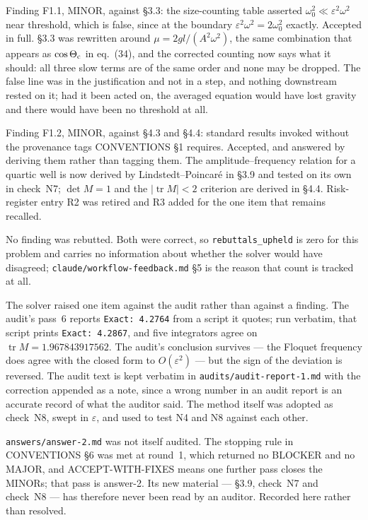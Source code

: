 \documentclass[11pt,a4paper]{article}
\begin{document}
Finding F1.1, MINOR, against \S3.3: the size-counting table asserted
$\omega_0^2\ll\varepsilon^2\omega^2$ near threshold, which is false, since at
the boundary $\varepsilon^2\omega^2=2\omega_0^2$ exactly. Accepted in full.
\S3.3 was rewritten around $\mu=2gl/(A^2\omega^2)$, the same combination that
appears as $\cos\Theta_{\rm c}$ in eq.~(34), and the corrected counting now says
what it should: all three slow terms are of the same order and none may be
dropped. The false line was in the justification and not in a step, and nothing
downstream rested on it; had it been acted on, the averaged equation would have
lost gravity and there would have been no threshold at all.

Finding F1.2, MINOR, against \S4.3 and \S4.4: standard results invoked without
the provenance tags CONVENTIONS \S1 requires. Accepted, and answered by deriving
them rather than tagging them. The amplitude--frequency relation for a quartic
well is now derived by Lindstedt--Poincar\'e in \S3.9 and tested on its own in
check~N7; $\det M=1$ and the $|\operatorname{tr}M|<2$ criterion are derived in
\S4.4. Risk-register entry R2 was retired and R3 added for the one item that
remains recalled.

No finding was rebutted. Both were correct, so \texttt{rebuttals\_upheld} is
zero for this problem and carries no information about whether the solver would
have disagreed; \texttt{claude/workflow-feedback.md} \S5 is the reason that
count is tracked at all.

The solver raised one item against the audit rather than against a finding. The
audit's pass~6 reports \texttt{Exact: 4.2764} from a script it quotes; run
verbatim, that script prints \texttt{Exact: 4.2867}, and five integrators agree
on $\operatorname{tr}M=1.967843917562$. The audit's conclusion survives --- the
Floquet frequency does agree with the closed form to $O(\varepsilon^2)$ --- but
the sign of the deviation is reversed. The audit text is kept verbatim in
\texttt{audits/audit-report-1.md} with the correction appended as a note, since
a wrong number in an audit report is an accurate record of what the auditor
said. The method itself was adopted as check~N8, swept in $\varepsilon$, and
used to test N4 and N8 against each other.

\texttt{answers/answer-2.md} was not itself audited. The stopping rule in
CONVENTIONS \S6 was met at round~1, which returned no BLOCKER and no MAJOR, and
ACCEPT-WITH-FIXES means one further pass closes the MINORs; that pass is
answer-2. Its new material --- \S3.9, check~N7 and check~N8 --- has therefore
never been read by an auditor. Recorded here rather than resolved.
\end{document}

